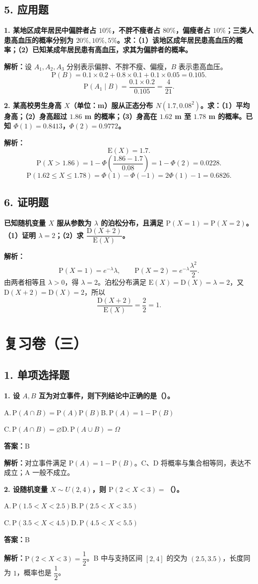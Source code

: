﻿\documentclass[UTF8,11pt,a4paper]{ctexart}
\newcommand{\Pp}{\mathrm{P}}
\newcommand{\E}{\mathrm{E}}
\newcommand{\D}{\mathrm{D}}
\newcommand{\Ans}[1]{\par\textbf{答案：}#1\par}
\newcommand{\Ana}[1]{\par\textbf{解析：}#1\par\medskip}
\newcommand{\Opt}[4]{\par A.\,#1\qquad B.\,#2\par C.\,#3\qquad D.\,#4\par}
\newcommand{\Q}[1]{\par\textbf{#1}\par}
\begin{document}
\subsection*{5. 应用题}
\Q{1. 某地区成年居民中偏胖者占 $10\%$，不胖不瘦者占 $80\%$，偏瘦者占 $10\%$；三类人患高血压的概率分别为 $20\%,10\%,5\%$。求：（1）该地区成年居民患高血压的概率；（2）已知某成年居民患有高血压，求其为偏胖者的概率。}
\Ana{设 $A_1,A_2,A_3$ 分别表示偏胖、不胖不瘦、偏瘦，$B$ 表示患高血压。
\[
\Pp(B)=0.1\times0.2+0.8\times0.1+0.1\times0.05=0.105.
\]
\[
\Pp(A_1\mid B)=\frac{0.1\times0.2}{0.105}=\frac4{21}.
\]}

\Q{2. 某高校男生身高 $X$（单位：m）服从正态分布 $N(1.7,0.08^2)$。求：（1）平均身高；（2）身高超过 $1.86$ m 的概率；（3）身高在 $1.62$ m 至 $1.78$ m 的概率。已知 $\Phi(1)=0.8413$，$\Phi(2)=0.9772$。}
\Ana{
\[
\E(X)=1.7.
\]
\[
\Pp(X>1.86)=1-\Phi\left(\frac{1.86-1.7}{0.08}\right)=1-\Phi(2)=0.0228.
\]
\[
\Pp(1.62\le X\le1.78)=\Phi(1)-\Phi(-1)=2\Phi(1)-1=0.6826.
\]}

\subsection*{6. 证明题}
\Q{已知随机变量 $X$ 服从参数为 $\lambda$ 的泊松分布，且满足 $\Pp(X=1)=\Pp(X=2)$。（1）证明 $\lambda=2$；（2）求 $\dfrac{\D(X+2)}{\E(X)}$。}
\Ana{
\[
\Pp(X=1)=e^{-\lambda}\lambda,\qquad \Pp(X=2)=e^{-\lambda}\frac{\lambda^2}{2}.
\]
由两者相等且 $\lambda>0$，得 $\lambda=2$。泊松分布满足 $\E(X)=\D(X)=\lambda=2$，又 $\D(X+2)=\D(X)=2$，所以
\[
\frac{\D(X+2)}{\E(X)}=\frac22=1.
\]}

\newpage
\section*{复习卷（三）}
\subsection*{1. 单项选择题}

\Q{1. 设 $A,B$ 互为对立事件，则下列结论中正确的是（\quad）。}
\Opt{$\Pp(A\cap B)=\Pp(A)\Pp(B)$}{$\Pp(A)=1-\Pp(B)$}{$\Pp(A\cap B)=\varnothing$}{$\Pp(A\cup B)=\Omega$}
\Ans{B}
\Ana{对立事件满足 $\Pp(A)=1-\Pp(B)$。C、D 将概率与集合相等同，表达不成立；A 一般不成立。}

\Q{2. 设随机变量 $X\sim U(2,4)$，则 $\Pp(2<X<3)=$（\quad）。}
\Opt{$\Pp(1.5<X<2.5)$}{$\Pp(2.5<X<3.5)$}{$\Pp(3.5<X<4.5)$}{$\Pp(4.5<X<5.5)$}
\Ans{B}
\Ana{$\Pp(2<X<3)=\dfrac12$。B 中与支持区间 $[2,4]$ 的交为 $(2.5,3.5)$，长度同为 $1$，概率也是 $\dfrac12$。}
\end{document}
